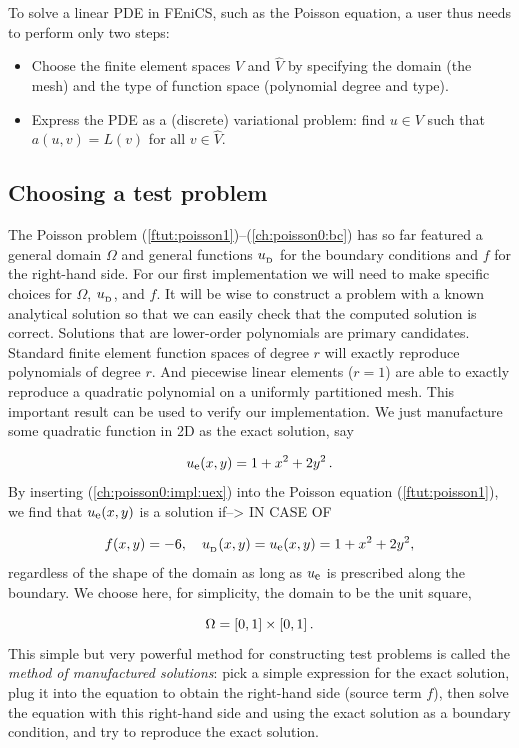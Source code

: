 \documentclass[graybox,envcountchap,sectrefs,final]{svmonodo}
\begin{document}
To solve a linear PDE in FEniCS, such as the Poisson equation, a user
thus needs to perform only two steps:

\begin{itemize}
  \item Choose the finite element spaces $V$ and $\hat V$ by specifying
    the domain (the mesh) and the type of function space (polynomial
    degree and type).

  \item Express the PDE as a (discrete) variational problem: find $u\in V$
    such that $a(u,v) = L(v)$ for all $v\in \hat{V}$.
\end{itemize}

\noindent
\subsection{Choosing a test problem}
\label{ch:poisson0:testproblem}

The Poisson problem (\ref{ftut:poisson1})--(\ref{ch:poisson0:bc}) has so
far featured a general domain $\Omega$ and general functions $\ub$ for
the boundary conditions and $f$ for the right-hand side. For our first
implementation we will need to make specific choices for $\Omega$,
$\ub$, and $f$.  It will be wise to construct a problem with a known
analytical solution so that we can easily check that the computed
solution is correct. Solutions that are lower-order polynomials are
primary candidates. Standard finite element function spaces of degree
$r$ will exactly reproduce polynomials of degree $r$. And piecewise
linear elements ($r=1$) are able to exactly reproduce a quadratic
polynomial on a uniformly partitioned mesh. This important result can
be used to verify our implementation. We just manufacture some
quadratic function in 2D as the exact solution, say


\begin{equation}
\label{ch:poisson0:impl:uex}
\uex(x,y) = 1 +x^2 + 2y^2\tp
\end{equation}
By inserting (\ref{ch:poisson0:impl:uex}) into the Poisson equation
(\ref{ftut:poisson1}), we find that $\uex(x,y)$ is a solution if--> IN CASE OF

\[ f(x,y) = -6,\quad \ub(x,y)=\uex(x,y)=1 + x^2 + 2y^2,\]
regardless of the shape of the domain as long as $\uex$ is prescribed along
the boundary. We choose here, for simplicity,
the domain to be the unit square,

\[ \Omega = [0,1]\times [0,1] \tp\]
This simple but very powerful method for constructing test problems is
called the \emph{method of manufactured solutions}: pick a simple
expression for the exact solution, plug it into the equation to obtain
the right-hand side (source term $f$), then solve the equation with
this right-hand side and using the exact solution as a boundary
condition, and try to reproduce the exact solution.
\end{document}
